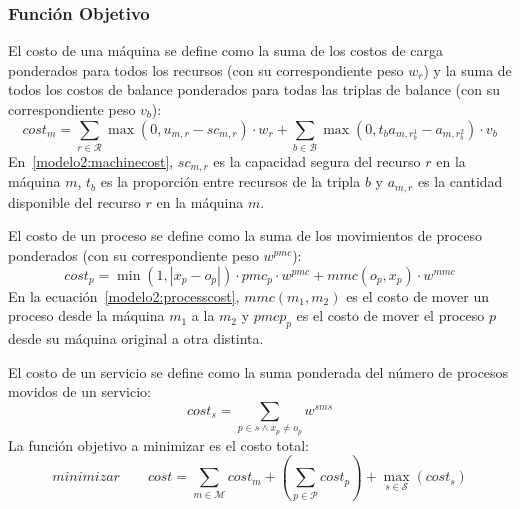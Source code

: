 \documentclass[../informe2.tex]{subfiles}
\begin{document}
\subsubsection{Función Objetivo}
El costo de una máquina se define como la suma de los costos de carga ponderados para todos los recursos (con su correspondiente peso $w_r$) y la suma de todos los costos de balance ponderados  para todas las triplas de balance (con su correspondiente peso $v_b$):
\begin{equation}\label{modelo2:machinecost}
	cost_m = \sum_{r \in \mathcal{R}}\max(0,u_{m,r}-sc_{m,r})\cdot w_r + \sum_{b \in \mathcal{B}}\max(0,t_ba_{m,r_{b}^1} - a_{m,r_{b}^2})\cdot v_b
\end{equation}
En~\eqref{modelo2:machinecost}, $sc_{m,r}$ es la capacidad segura del recurso $r$ en la máquina $m$, $t_b$ es la proporción entre recursos de la tripla $b$ y $a_{m,r}$ es la cantidad disponible del recurso $r$ en la máquina $m$. \par
\noindent El costo de un proceso se define como la suma de los movimientos de proceso ponderados (con su correspondiente peso $w^{pmc}$):
\begin{equation}\label{modelo2:processcost}
	cost_p = \min(1,|x_p - o_p|)\cdot pmc_p\cdot w^{pmc} + mmc(o_p,x_p)\cdot w^{mmc}
\end{equation}
En la ecuación~\eqref{modelo2:processcost}, $mmc(m_1,m_2)$ es el costo de mover un proceso desde la máquina $m_1$ a la $m_2$ y $pmcp_p$ es el costo de mover el proceso $p$ desde su máquina original a otra distinta. \par
\noindent El costo de un servicio se define como la suma ponderada del número de procesos movidos de un servicio:
\begin{equation}\label{modelo2:servicecost}
	cost_s = \sum_{p \in s \wedge x_p \neq o_p}w^{sms}
\end{equation}
La función objetivo a minimizar es el costo total:
\begin{equation}\label{modelo2:overallcost}
	minimizar \qquad cost = \sum_{m \in \mathcal{M}}cost_m + (\sum_{p \in \mathcal{P}}cost_p) + \max\limits_{s \in \mathcal{S}}(cost_s)
\end{equation}
\end{document}
